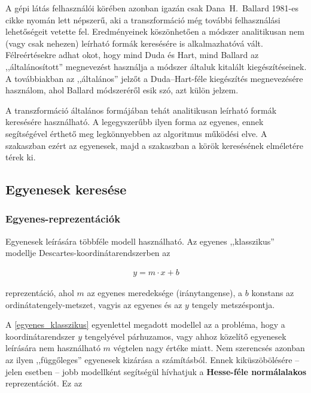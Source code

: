 A gépi látás felhasználói körében azonban igazán csak Dana~H.~Ballard 1981-es cikke \cite{hough_ballard} nyomán lett népszerű, aki a transzformáció még további felhasználási lehetőségeit vetette fel. Eredményeinek köszönhetően a módszer analitikusan nem (vagy csak nehezen) leírható formák keresésére is alkalmazhatóvá vált. Félreértésekre adhat okot, hogy mind Duda és Hart, mind Ballard az ,,általánosított'' megnevezést használja a módszer általuk kitalált kiegészítéseinek. A továbbiakban az ,,általános'' jelzőt a Duda--Hart-féle kiegészítés megnevezésére használom, ahol Ballard módszeréről esik szó, azt külön jelzem.

\bigskip

A transzformáció általános formájában tehát analitikusan leírható formák keresésére használható. A legegyszerűbb ilyen forma az egyenes, ennek segítségével érthető meg legkönnyebben az algoritmus működési elve. A  szakaszban ezért az egyenesek, majd a  szakaszban a körök keresésének elméletére térek ki.

\subsection{Egyenesek keresése}\label{sect:egyenesek_keresese}

\subsubsection{Egyenes-reprezentációk}\label{sect:egyenes_reprezentaciok}

Egyenesek leírására többféle modell használható. Az egyenes ,,klasszikus'' modellje Descartes-koordinátarendszerben az

\begin{align}\label{eq:egyenes_klasszikus}
y = m \cdot x + b
\end{align}

reprezentáció, ahol $ m $ az egyenes meredeksége (iránytangense), a $ b $ konstans az ordinátatengely-metszet, vagyis az egyenes és az $ y $ tengely metszéspontja.

A \eqref{egyenes_klasszikus} egyenlettel megadott modellel az a probléma, hogy a koordinátarendszer $ y $ tengelyével párhuzamos, vagy ahhoz közelítő egyenesek leírására nem használható $ m $ végtelen nagy értéke miatt. Nem szerencsés azonban az ilyen ,,függőleges'' egyenesek kizárása a számításból. Ennek kiküszöbölésére -- jelen esetben -- jobb modellként segítségül hívhatjuk a \textbf{Hesse-féle normálalakos} reprezentációt. Ez az

